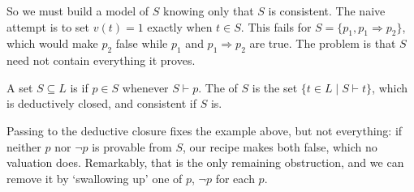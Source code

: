So we must build a model of $S$ knowing only that $S$ is consistent. The naive attempt is to set $v(t) = 1$ exactly when $t \in S$. This fails for $S = \{p_1, p_1 \Rightarrow p_2\}$, which would make $p_2$ false while $p_1$ and $p_1 \Rightarrow p_2$ are true. The problem is that $S$ need not contain everything it proves.

\begin{definition}
  A set $S \subseteq L$ is  if $p \in S$ whenever $S \vdash p$. The  of $S$ is the set $\{t \in L \mid S \vdash t\}$, which is deductively closed, and consistent if $S$ is.
\end{definition}

Passing to the deductive closure fixes the example above, but not everything: if neither $p$ nor $\lnot p$ is provable from $S$, our recipe makes both false, which no valuation does. Remarkably, that is the only remaining obstruction, and we can remove it by `swallowing up' one of $p$, $\lnot p$ for each $p$.

